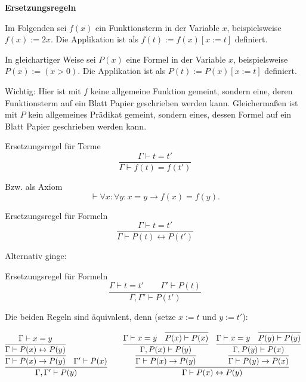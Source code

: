 \documentclass[8pt]{beamer}
\newcommand{\strong}[1]{\textsf{\textbf{#1}}}
\newcommand{\centerheadline}[1]{%
  \begin{center}\strong{#1}\end{center}}
\newcommand{\parspace}{\vspace{0.8em}}
\newcommand{\cond}{\rightarrow}
\newcommand{\bicond}{\leftrightarrow}
\begin{document}
\begin{frame}
\centerheadline{Ersetzungsregeln}
\end{frame}

\begin{frame}
Im Folgenden sei $f(x)$ ein Funktionsterm in der Variable $x$,
beispielsweise $f(x):=2x$. Die Applikation ist als $f(t):=f(x)[x:=t]$
definiert.\pause

\parspace
In gleichartiger Weise sei $P(x)$ eine Formel in der Variable $x$,
beispielsweise $P(x):=(x>0)$. Die Applikation ist als $P(t):=P(x)[x:=t]$
definiert.\pause

\parspace
Wichtig: Hier ist mit $f$ keine allgemeine Funktion gemeint, sondern
eine, deren Funktionsterm auf ein Blatt Papier geschrieben werden kann.
Gleichermaßen ist mit $P$ kein allgemeines Prädikat gemeint, sondern
eines, dessen Formel auf ein Blatt Papier geschrieben werden kann.
\end{frame}

\begin{frame}
\begin{block}{Ersetzungsregel für Terme}
\[\dfrac{\Gamma\vdash t=t'}{\Gamma\vdash f(t)=f(t')}\]
\end{block}
Bzw. als Axiom
\[\vdash \forall x\colon\forall y\colon x=y\cond f(x)=f(y).\]
\end{frame}

\begin{frame}
\begin{block}{Ersetzungsregel für Formeln}
\[\dfrac{\Gamma\vdash t=t'}{\Gamma\vdash P(t)\bicond P(t')}\]
\end{block}\pause
Alternativ ginge:
\begin{block}{Ersetzungsregel für Formeln}
\[\dfrac{\Gamma\vdash t=t'\qquad\Gamma'\vdash P(t)}{\Gamma,\Gamma'\vdash P(t')}\]
\end{block}\pause
Die beiden Regeln sind äquivalent, denn (setze $x:=t$ und $y:=t'$):
\begin{small}
\[
\begin{array}{@{}l@{\qquad}l}
\infer{\Gamma,\Gamma'\vdash P(y)}{
  \infer{\Gamma\vdash P(x)\cond P(y)}{
    \infer{\Gamma\vdash P(x)\bicond P(y)}{\Gamma\vdash x=y}}
& \Gamma'\vdash P(x)}
&
\infer{\Gamma\vdash P(x)\bicond P(y)}{
  \infer{\Gamma\vdash P(x)\cond P(y)}{
    \infer{\Gamma, P(x)\vdash P(y)}{
      \Gamma\vdash x=y & \infer{P(x)\vdash P(x)}{}}}
& \infer{\Gamma\vdash P(y)\cond P(x)}{
    \infer{\Gamma,P(y)\vdash P(x)}{
      \Gamma\vdash x=y & \infer{P(y)\vdash P(y)}{}}}}
\end{array}
\]
\end{small}
\end{frame}
\end{document}
